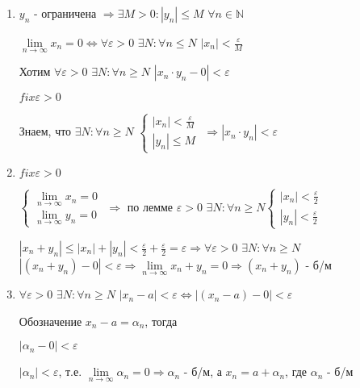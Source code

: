 \documentclass[14pt, letter paper]{article}
\begin{document}
\begin{enumerate}
    \item $y_n$ - ограничена $\Rightarrow \exists M > 0 : |y_n| \leq M$ $\forall n \in \mathds{N}$

    $\lim\limits_{n \rightarrow \infty}{x_n} = 0 \Leftrightarrow \forall \varepsilon > 0$ $\exists N : \forall n \leq N$ $|x_n| < \frac{\varepsilon}{M}$

    Хотим $\forall \varepsilon > 0$ $\exists N : \forall n \geq N$ $|x_n \cdot y_n - 0| < \varepsilon$

    $fix \varepsilon > 0$

    Знаем, что $\exists N : \forall n \geq N$ $\begin{cases}
        |x_n| < \frac{\varepsilon}{M} \\
        |y_n| \leq M
    \end{cases}$
    $\Rightarrow |x_n \cdot y_n| < \varepsilon$

    \item $fix \varepsilon > 0$

    $\begin{cases}
        \lim\limits_{n \rightarrow \infty}{x_n} = 0 \\
        \lim\limits_{n \rightarrow \infty}{y_n} = 0
    \end{cases}$
    $\Rightarrow$ по лемме $\varepsilon > 0$ $\exists N : \forall n \geq N \begin{cases}
        |x_n| < \frac{\varepsilon}{2} \\
        |y_n| < \frac{\varepsilon}{2}
    \end{cases}$

    $|x_n + y_n| \leq |x_n| + |y_n| < \frac{\varepsilon}{2} + \frac{\varepsilon}{2} = \varepsilon \Rightarrow \forall \varepsilon > 0$ $\exists N : \forall n \geq N$ $|(x_n + y_n) - 0| < \varepsilon \Rightarrow \lim\limits_{n \rightarrow \infty}{x_n + y_n} = 0 \Rightarrow (x_n + y_n)$ - б/м

    \item $\forall \varepsilon > 0$ $\exists N : \forall n \geq N$ $|x_n - a| < \varepsilon \Leftrightarrow |(x_n - a) - 0| < \varepsilon$

    Обозначение $x_n - a = \alpha_n$, тогда 

    $|\alpha_n - 0| < \varepsilon$

    $|\alpha_n| < \varepsilon$, т.е. $\lim\limits_{n \rightarrow \infty}{\alpha_n} = 0 \Rightarrow \alpha_n$ - б/м, а $x_n = a + \alpha_n$, где $\alpha_n$ - б/м
\end{enumerate}
\end{document}
